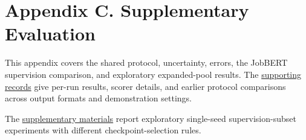 \section{Appendix C. Supplementary Evaluation}
\label{app:c}
This appendix covers the shared protocol, uncertainty, errors, the JobBERT supervision comparison, and exploratory expanded-pool results. The \href{https://github.com/AlfredJamesLi/chinese-skillspan-benchmark/blob/1d1c24e20ee049fc768034b5baf58fa882e08e2c/reproduction/process_archive_20260924/secondary_review/README.md}{supporting records} give per-run results, scorer details, and earlier protocol comparisons across output formats and demonstration settings.




\FloatBarrier



The \href{https://github.com/AlfredJamesLi/chinese-skillspan-benchmark/blob/36f009fab01b8433355cb7ef5af8fad02c6cc519/reproduction/process_archive_20260924/README.md}{supplementary materials} report exploratory single-seed supervision-subset experiments with different checkpoint-selection rules.
